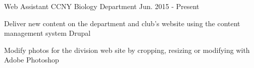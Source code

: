 \begin{cventries}
\iftrue
  \cventry
    {Web Assistant} %
    {CCNY Biology Department} %
	{Jun. 2015 - Present} %
    {} %
    {
      \begin{cvitems} %
        \item {Deliver new content on the department and club's website using the content management system Drupal}
        \item {Modify photos for the division web site by cropping,
		  resizing or modifying with Adobe Photoshop}
      \end{cvitems}
    }
\fi

\iffalse
  \cventry
    {Office Assistant} %
    {Zahn Innovation Center} %
	{Jan. 2015 - May. 2015} %
    {} %
    {
      \begin{cvitems} %
        \item {Processed applications and deliverables from competing startups}
        \item {Sorted incoming internship and funding offers and directed them
		  to the appropriate individuals}
        \item {Motivated the competing teams and provided feedback on their ideas}
        \item {Arranged events to inspire entrepreneurship in startup members}
      \end{cvitems}
    }
\fi


\end{cventries}
